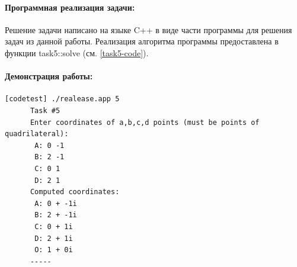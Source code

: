 {   \paragraph{Программная реализация задачи:} Решение задачи написано на языке C++ в виде части
   программы для решения задач из данной работы.
   Реализация алгоритма программы предоставлена в функции task5::solve (см. \ref{task5-code}).
   \paragraph{Демонстрация работы:}
   \vphantom{code}
   \begin{lstlisting}[language={},frame=none]
      [codetest] ./realease.app 5
      Task #5
      Enter coordinates of a,b,c,d points (must be points of quadrilateral):
       A: 0 -1
       B: 2 -1
       C: 0 1
       D: 2 1
      Computed coordinates:
       A: 0 + -1i
       B: 2 + -1i
       C: 0 + 1i
       D: 2 + 1i
       O: 1 + 0i
      -----
   \end{lstlisting}
}
